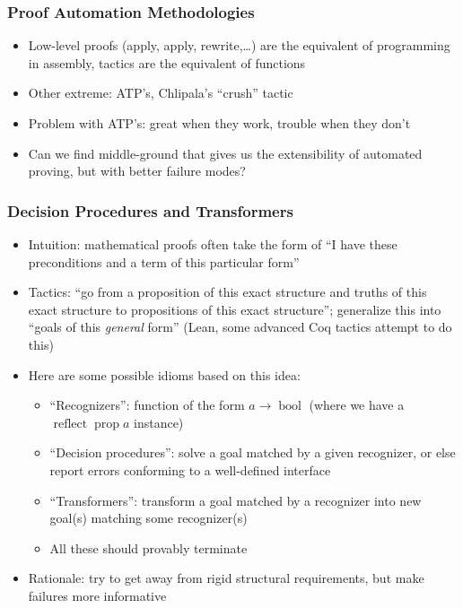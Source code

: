 \documentclass{beamer}
\begin{document}
\begin{frame}
  \frametitle{Proof Automation Methodologies}
  \begin{itemize}
    \item Low-level proofs (apply, apply, rewrite,\ldots) are the
      equivalent of programming in assembly, tactics are the
      equivalent of functions
    \item Other extreme: ATP's, Chlipala's ``crush'' tactic
    \item Problem with ATP's: great when they work, trouble when they don't
    \item Can we find middle-ground that gives us the extensibility of
      automated proving, but with better failure modes?
  \end{itemize}
\end{frame}

\begin{frame}
  \frametitle{Decision Procedures and Transformers}
  \begin{itemize}
    \item Intuition: mathematical proofs often take the form of ``I
      have these preconditions and a term of this particular form''
    \item Tactics: ``go from a proposition of this exact structure and
      truths of this exact structure to propositions of this exact
      structure''; generalize this into ``goals of this \emph{general} form''
      (Lean, some advanced Coq tactics attempt to do this)
    \item Here are some possible idioms based on this idea:
      \begin{itemize}
        \item ``Recognizers'': function of the form $a \rightarrow
          \operatorname{bool}$ (where we have a $\operatorname{reflect}
          \operatorname{prop} a$ instance)
        \item ``Decision procedures'': solve a goal matched by a given
          recognizer, or else report errors conforming to a
          well-defined interface
        \item ``Transformers'': transform a goal matched by a
          recognizer into new goal(s) matching some recognizer(s)
        \item All these should provably terminate
      \end{itemize}
    \item Rationale: try to get away from rigid structural
      requirements, but make failures more informative
  \end{itemize}
\end{frame}
\end{document}
